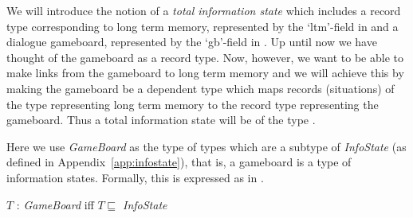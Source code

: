We will introduce the notion of a \textit{total information state} \citep[\textit{cf.}][]{Larsson2002}
which includes a record type corresponding to long term memory,
represented by the `ltm'-field in \nexteg{} and a dialogue gameboard,
represented by the `gb'-field in \nexteg{}.  Up until now we have
thought of the gameboard as a record type.  Now, however, we want to
be able to make links from the gameboard to long term memory and we
will achieve this by making the gameboard be a dependent type which
maps records (situations) of the type representing long term memory to
the record type representing the gameboard.  Thus a total information state
will be of the type \nexteg{}.
\begin{ex} 
\end{ex} 
Here we use \textit{GameBoard} as the type of types which are a
subtype of \textit{InfoState} (as defined in Appendix~\ref{app:infostate}), that is, a gameboard is a type of
information states.  Formally, this is expressed as in \nexteg{}.
\begin{ex} 
$T$ : \textit{GameBoard} iff $T\sqsubseteq$ \textit{InfoState}
\label{ex:GameBoard}
\end{ex} 


